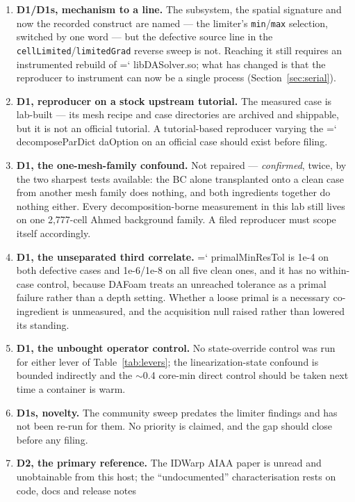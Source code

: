 \documentclass[11pt,a4paper]{article}
\newcommand{\artifact}[1]{{\small\ttfamily\hyphenchar\font=`\-\relax
  \def\_{\textunderscore\allowbreak}#1}}
\begin{document}
\begin{enumerate}
\item \textbf{D1/D1s, mechanism to a line.} The subsystem, the spatial signature and now the
recorded construct are named --- the limiter's \texttt{min}/\texttt{max} selection, switched by
one word --- but the defective source line in the
\texttt{cellLimited}/\texttt{limitedGrad} reverse sweep is not. Reaching it still requires an
instrumented rebuild of \artifact{libDASolver.so}; what has changed is that the reproducer to
instrument can now be a single process (Section~\ref{sec:serial}).
\item \textbf{D1, reproducer on a stock upstream tutorial.} The measured case is lab-built
--- its mesh recipe and case directories are archived and shippable, but it is not an official
tutorial. A tutorial-based reproducer varying the \artifact{decomposeParDict} daOption on an
official case should exist before filing.
\item \textbf{D1, the one-mesh-family confound.} Not repaired --- \emph{confirmed}, twice, by
the two sharpest tests available: the BC alone transplanted onto a clean case from another mesh
family does nothing, and both ingredients together do nothing either. Every decomposition-borne
measurement in this lab still lives on one 2{,}777-cell Ahmed background family. A filed
reproducer must scope itself accordingly.
\item \textbf{D1, the unseparated third correlate.} \artifact{primalMinResTol} is 1e-4 on both
defective cases and 1e-6/1e-8 on all five clean ones, and it has no within-case control,
because DAFoam treats an unreached tolerance as a primal failure rather than a depth setting.
Whether a loose primal is a necessary co-ingredient is unmeasured, and the acquisition null
raised rather than lowered its standing.
\item \textbf{D1, the unbought operator control.} No state-override control was run for either
lever of Table~\ref{tab:levers}; the linearization-state confound is bounded indirectly and the
\(\sim\)0.4 core-min direct control should be taken next time a container is warm.
\item \textbf{D1s, novelty.} The community sweep predates the limiter findings and has not
been re-run for them. No priority is claimed, and the gap should close before any filing.
\item \textbf{D2, the primary reference.} The IDWarp AIAA paper is unread and unobtainable
from this host; the ``undocumented'' characterisation rests on code, docs and release notes

\end{enumerate}
\end{document}
